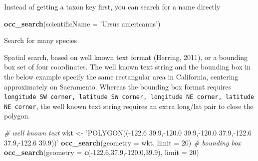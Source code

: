 \documentclass[author-year, review, 11pt]{components/elsarticle} %
\newenvironment{Shaded}{\begin{snugshade}}{\end{snugshade}}
\newcommand{\KeywordTok}[1]{\textcolor[rgb]{0.13,0.29,0.53}{\textbf{{#1}}}}
\newcommand{\DataTypeTok}[1]{\textcolor[rgb]{0.13,0.29,0.53}{{#1}}}
\newcommand{\DecValTok}[1]{\textcolor[rgb]{0.00,0.00,0.81}{{#1}}}
\newcommand{\FloatTok}[1]{\textcolor[rgb]{0.00,0.00,0.81}{{#1}}}
\newcommand{\StringTok}[1]{\textcolor[rgb]{0.31,0.60,0.02}{{#1}}}
\newcommand{\CommentTok}[1]{\textcolor[rgb]{0.56,0.35,0.01}{\textit{{#1}}}}
\newcommand{\OtherTok}[1]{\textcolor[rgb]{0.56,0.35,0.01}{{#1}}}
\newcommand{\NormalTok}[1]{{#1}}
\begin{document}
Instead of getting a taxon key first, you can search for a name directly

\begin{Shaded}
\begin{Highlighting}[]
\KeywordTok{occ_search}\NormalTok{(}\DataTypeTok{scientificName =} \StringTok{'Ursus americanus'}\NormalTok{)}
\end{Highlighting}
\end{Shaded}

Search for many species

\begin{Shaded}
\end{Shaded}

Spatial search, based on well known text format (Herring, 2011), or a
bounding box set of four coordinates. The well known text string and the
bounding box in the below example specify the same rectangular area in
California, centering approximately on Sacramento. Whereas the bounding
box format requires
\texttt{longitude SW corner, latitude SW corner, longitude NE corner, latitude NE corner},
the well known text string requires an extra long/lat pair to close the
polygon.

\begin{Shaded}
\begin{Highlighting}[]
\CommentTok{# well known text}
\NormalTok{wkt <-}\StringTok{ 'POLYGON((-122.6 39.9,-120.0 39.9,-120.0 37.9,-122.6 37.9,-122.6 39.9))'}
\KeywordTok{occ_search}\NormalTok{(}\DataTypeTok{geometry =} \NormalTok{wkt, }\DataTypeTok{limit =} \DecValTok{20}\NormalTok{)}
\CommentTok{# bounding box}
\KeywordTok{occ_search}\NormalTok{(}\DataTypeTok{geometry =} \KeywordTok{c}\NormalTok{(-}\FloatTok{122.6}\NormalTok{,}\FloatTok{37.9}\NormalTok{,-}\FloatTok{120.0}\NormalTok{,}\FloatTok{39.9}\NormalTok{), }\DataTypeTok{limit =} \DecValTok{20}\NormalTok{)}
\end{Highlighting}
\end{Shaded}
\end{document}
